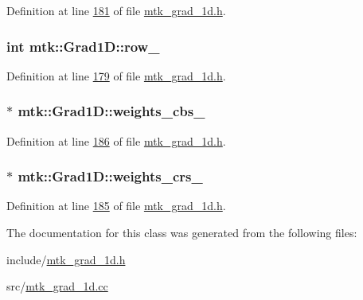 Definition at line \hyperlink{mtk__grad__1d_8h_source_l00181}{181} of file \hyperlink{mtk__grad__1d_8h_source}{mtk\-\_\-grad\-\_\-1d.\-h}.

\hypertarget{classmtk_1_1Grad1D_a7947235d61d0dd27c5b81a81ca78d9a8}{
\subsubsection[{row\-\_\-}]{\setlength{\rightskip}{0pt plus 5cm}int mtk\-::\-Grad1\-D\-::row\-\_\-\hspace{0.3cm}{\ttfamily [private]}}}\label{classmtk_1_1Grad1D_a7947235d61d0dd27c5b81a81ca78d9a8}


Definition at line \hyperlink{mtk__grad__1d_8h_source_l00179}{179} of file \hyperlink{mtk__grad__1d_8h_source}{mtk\-\_\-grad\-\_\-1d.\-h}.

\hypertarget{classmtk_1_1Grad1D_ae6b0a908748923b2acd97e5bf7acc000}{
\subsubsection[{weights\-\_\-cbs\-\_\-}]{$\ast$ mtk\-::\-Grad1\-D\-::weights\-\_\-cbs\-\_\-\hspace{0.3cm}{\ttfamily [private]}}}\label{classmtk_1_1Grad1D_ae6b0a908748923b2acd97e5bf7acc000}


Definition at line \hyperlink{mtk__grad__1d_8h_source_l00186}{186} of file \hyperlink{mtk__grad__1d_8h_source}{mtk\-\_\-grad\-\_\-1d.\-h}.

\hypertarget{classmtk_1_1Grad1D_a96914abea78528b32499963ce9bbe4a6}{
\subsubsection[{weights\-\_\-crs\-\_\-}]{$\ast$ mtk\-::\-Grad1\-D\-::weights\-\_\-crs\-\_\-\hspace{0.3cm}{\ttfamily [private]}}}\label{classmtk_1_1Grad1D_a96914abea78528b32499963ce9bbe4a6}


Definition at line \hyperlink{mtk__grad__1d_8h_source_l00185}{185} of file \hyperlink{mtk__grad__1d_8h_source}{mtk\-\_\-grad\-\_\-1d.\-h}.



The documentation for this class was generated from the following files\-:\begin{DoxyCompactItemize}
\item 
include/\hyperlink{mtk__grad__1d_8h}{mtk\-\_\-grad\-\_\-1d.\-h}\item 
src/\hyperlink{mtk__grad__1d_8cc}{mtk\-\_\-grad\-\_\-1d.\-cc}\end{DoxyCompactItemize}
